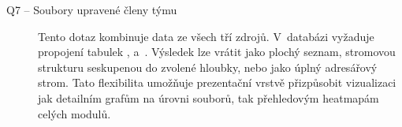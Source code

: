 \begin{description}
  \item[Q7 -- Soubory upravené členy týmu]
    Tento dotaz kombinuje data ze všech tří zdrojů. V~databázi vyžaduje propojení tabulek ,  a~. Výsledek lze vrátit jako plochý seznam, stromovou strukturu seskupenou do zvolené hloubky, nebo jako úplný adresářový strom. Tato flexibilita umožňuje prezentační vrstvě  přizpůsobit vizualizaci jak detailním grafům na úrovni souborů, tak přehledovým heatmapám celých modulů.
\end{description}
